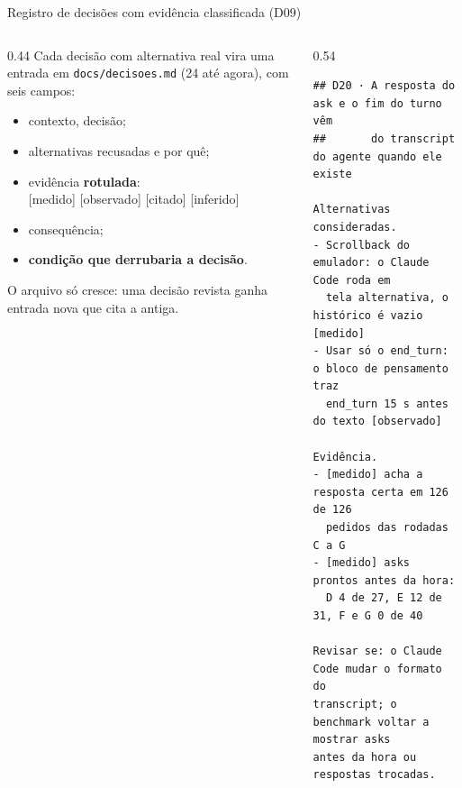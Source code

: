 \documentclass[11pt,aspectratio=169]{beamer}
\newcommand{\ev}[2]{{\scriptsize\sffamily\colorbox{#1!12}{\textcolor{#1!80!black}{[#2]}}}}
\newcommand{\medido}{\ev{ok}{medido}}
\newcommand{\observado}{\ev{cDevA}{observado}}
\newcommand{\citado}{\ev{suave}{citado}}
\newcommand{\inferido}{\ev{alerta}{inferido}}
\begin{document}
\begin{frame}[fragile]{Registro de decisões com evidência classificada (D09)}
\begin{columns}[T]
\begin{column}{0.44\linewidth}
\small
Cada decisão com alternativa real vira uma entrada em \texttt{docs/decisoes.md} (24 até agora), com seis campos:
\begin{itemize}\setlength\itemsep{0.2em}
\item contexto, decisão;
\item alternativas recusadas e por quê;
\item evidência \textbf{rotulada}:\\
  \medido{} \observado{} \citado{} \inferido{}
\item consequência;
\item \textbf{condição que derrubaria a decisão}.
\end{itemize}
\vspace{0.3em}
{\scriptsize\color{suave} O arquivo só cresce: uma decisão revista ganha entrada nova que cita a antiga.}
\end{column}
\begin{column}{0.54\linewidth}
\begin{lstlisting}[basicstyle=\ttfamily\tiny]
## D20 · A resposta do ask e o fim do turno vêm
##       do transcript do agente quando ele existe

Alternativas consideradas.
- Scrollback do emulador: o Claude Code roda em
  tela alternativa, o histórico é vazio [medido]
- Usar só o end_turn: o bloco de pensamento traz
  end_turn 15 s antes do texto [observado]

Evidência.
- [medido] acha a resposta certa em 126 de 126
  pedidos das rodadas C a G
- [medido] asks prontos antes da hora:
  D 4 de 27, E 12 de 31, F e G 0 de 40

Revisar se: o Claude Code mudar o formato do
transcript; o benchmark voltar a mostrar asks
antes da hora ou respostas trocadas.
\end{lstlisting}
\end{column}
\end{columns}
\end{frame}
\end{document}

